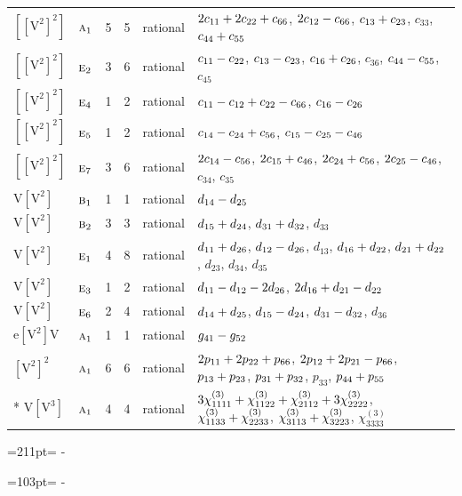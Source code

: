 \documentclass[10pt,a4paper]{article}
\newcommand{\needspace}[1]{\par\penalty-100\begingroup\dimen0=#1\relax\dimen2=\pagegoal
  \advance\dimen2-\pagetotal\ifdim\dimen0>\dimen2\relax\ifdim\dimen2>0pt\vfil\break\fi\fi
  \endgroup}
\numberwithin{equation}{section}
\newcommand{\irr}[1]{\text{\normalfont\scshape #1}}
\newcommand{\jahn}[1]{\mathrm{#1}}
\newlength{\fillwidth}\newlength{\cellwidth}\newlength{\colwidth}
\newcommand{\signbreak}{\penalty100\relax}
\begin{document}
{\begin{longtable}{@{}llrrl>{\RaggedRight\arraybackslash}p{\fillwidth}@{}}
$\jahn{[[V^{2}]^{2}]}$ & $\irr{a}_{1}$ & 5 & 5 & rational & $2c_{11} +\signbreak 2c_{22} +\signbreak c_{66}$, $2c_{12} -\signbreak c_{66}$, $c_{13} +\signbreak c_{23}$, $c_{33}$, $c_{44} +\signbreak c_{55}$\\
$\jahn{[[V^{2}]^{2}]}$ & $\irr{e}_{2}$ & 3 & 6 & rational & $c_{11} -\signbreak c_{22}$, $c_{13} -\signbreak c_{23}$, $c_{16} +\signbreak c_{26}$, $c_{36}$, $c_{44} -\signbreak c_{55}$, $c_{45}$\\
$\jahn{[[V^{2}]^{2}]}$ & $\irr{e}_{4}$ & 1 & 2 & rational & $c_{11} -\signbreak c_{12} +\signbreak c_{22} -\signbreak c_{66}$, $c_{16} -\signbreak c_{26}$\\
$\jahn{[[V^{2}]^{2}]}$ & $\irr{e}_{5}$ & 1 & 2 & rational & $c_{14} -\signbreak c_{24} +\signbreak c_{56}$, $c_{15} -\signbreak c_{25} -\signbreak c_{46}$\\
$\jahn{[[V^{2}]^{2}]}$ & $\irr{e}_{7}$ & 3 & 6 & rational & $2c_{14} -\signbreak c_{56}$, $2c_{15} +\signbreak c_{46}$, $2c_{24} +\signbreak c_{56}$, $2c_{25} -\signbreak c_{46}$, $c_{34}$, $c_{35}$\\
$\jahn{V[V^{2}]}$ & $\irr{b}_{1}$ & 1 & 1 & rational & $d_{14} -\signbreak d_{25}$\\
$\jahn{V[V^{2}]}$ & $\irr{b}_{2}$ & 3 & 3 & rational & $d_{15} +\signbreak d_{24}$, $d_{31} +\signbreak d_{32}$, $d_{33}$\\
$\jahn{V[V^{2}]}$ & $\irr{e}_{1}$ & 4 & 8 & rational & $d_{11} +\signbreak d_{26}$, $d_{12} -\signbreak d_{26}$, $d_{13}$, $d_{16} +\signbreak d_{22}$, $d_{21} +\signbreak d_{22}$, $d_{23}$, $d_{34}$, $d_{35}$\\
$\jahn{V[V^{2}]}$ & $\irr{e}_{3}$ & 1 & 2 & rational & $d_{11} -\signbreak d_{12} -\signbreak 2d_{26}$, $2d_{16} +\signbreak d_{21} -\signbreak d_{22}$\\
$\jahn{V[V^{2}]}$ & $\irr{e}_{6}$ & 2 & 4 & rational & $d_{14} +\signbreak d_{25}$, $d_{15} -\signbreak d_{24}$, $d_{31} -\signbreak d_{32}$, $d_{36}$\\
$\jahn{e[V^{2}]V}$ & $\irr{a}_{1}$ & 1 & 1 & rational & $\mathnormal{g}_{41} -\signbreak \mathnormal{g}_{52}$\\
$\jahn{[V^{2}]^{2}}$ & $\irr{a}_{1}$ & 6 & 6 & rational & $2p_{11} +\signbreak 2p_{22} +\signbreak p_{66}$, $2p_{12} +\signbreak 2p_{21} -\signbreak p_{66}$, $p_{13} +\signbreak p_{23}$, $p_{31} +\signbreak p_{32}$, $p_{33}$, $p_{44} +\signbreak p_{55}$\\*
$\jahn{V[V^{3}]}$ & $\irr{a}_{1}$ & 4 & 4 & rational & $3\chi^{(3)}_{1111} +\signbreak \chi^{(3)}_{1122} +\signbreak \chi^{(3)}_{2112} +\signbreak 3\chi^{(3)}_{2222}$, $\chi^{(3)}_{1133} +\signbreak \chi^{(3)}_{2233}$, $\chi^{(3)}_{3113} +\signbreak \chi^{(3)}_{3223}$, $\chi^{(3)}_{3333}$\\
\bottomrule\end{longtable}}
\needspace{211pt}
\needspace{103pt}
\end{document}
